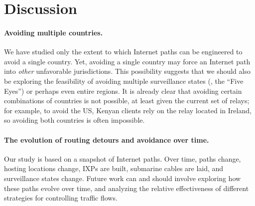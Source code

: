 \section{Discussion}
\label{discussion}

\paragraph{Avoiding multiple countries.} 
We have studied only the extent to which Internet paths can be
engineered to avoid a {single} country.  Yet, avoiding a single country
may force an Internet path into {\em other} unfavorable
jurisdictions. This possibility suggests that we should also be
exploring the feasibility of avoiding multiple surveillance states (\eg,
the ``Five Eyes'') or perhaps even entire regions. It is already clear
that avoiding certain combinations of countries is not possible, at
least given the current set of relays; for
example, to avoid the US, Kenyan clients rely on the relay located in
Ireland, so avoiding both countries is often impossible.

\paragraph{The evolution of routing detours and avoidance over time.}
Our study is based on a snapshot of Internet paths. Over time, paths
change, hosting locations change, IXPs are built, submarine cables are
laid, and surveillance states change.  Future work can and should
involve exploring how these paths evolve over time, and analyzing the
relative effectiveness of different strategies for controlling traffic flows.


